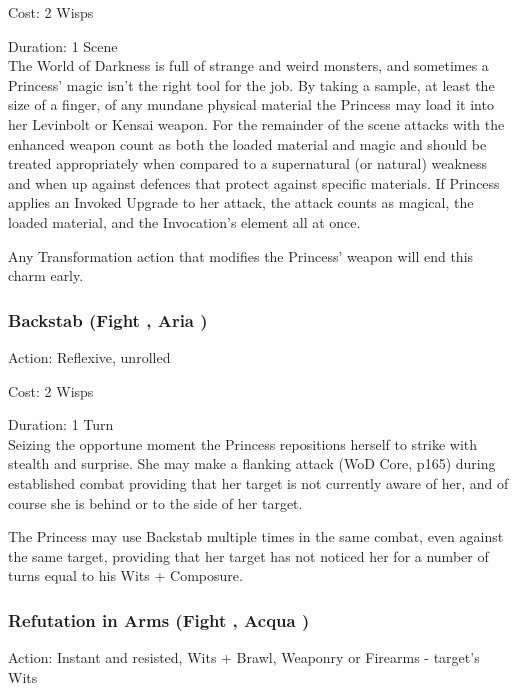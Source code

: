 \noindent Cost: 2 Wisps

\noindent Duration: 1 Scene \\

The World of Darkness is full of strange and weird monsters, and sometimes a Princess' magic isn't the right tool for the job. By taking a sample, at least the size of a finger, of any mundane physical material the Princess may load it into her Levinbolt or Kensai weapon. For the remainder of the scene attacks with the enhanced weapon count as both the loaded material and magic and should be treated appropriately when compared to a supernatural (or natural) weakness and when up against defences that protect against specific materials. If Princess applies an Invoked Upgrade to her attack, the attack counts as magical, the loaded material, and the Invocation's element all at once. 

Any Transformation action that modifies the Princess' weapon will end this charm early. 

\subsubsection*{Backstab (Fight \textbullet\textbullet\textbullet, Aria \textbullet\textbullet\textbullet)}

\noindent Action: Reflexive, unrolled

\noindent Cost: 2 Wisps

\noindent Duration: 1 Turn\\

\noindent Seizing the opportune moment the Princess repositions herself to strike with stealth and surprise. She may make a flanking attack (WoD Core, p165) during established combat providing that her target is not currently aware of her, and of course she is behind or to the side of her target. 

The Princess may use Backstab multiple times in the same combat, even against the same target, providing that her target has not noticed her for a number of turns equal to his Wits + Composure. 

\subsubsection*{Refutation in Arms (Fight \textbullet\textbullet\textbullet, Acqua \textbullet\textbullet)}

\noindent Action: Instant and resisted, Wits + Brawl, Weaponry or Firearms - target's Wits

